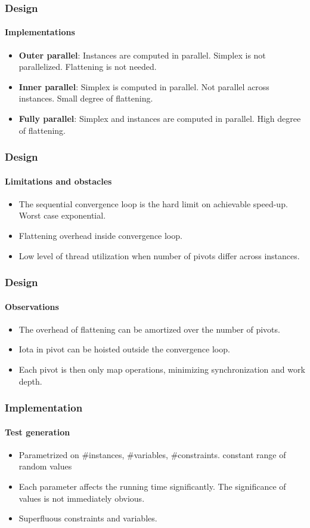 \documentclass{beamer}
\begin{document}
\begin{frame}
\frametitle{Design}
\framesubtitle{Implementations}
\begin{itemize}
	\item \textbf{Outer parallel}: Instances are computed in parallel. Simplex is not parallelized. Flattening is not needed.
	
	\item \textbf{Inner parallel}: Simplex is computed in parallel. Not parallel across instances. Small degree of flattening.
	
	\item \textbf{Fully parallel}: Simplex and instances are computed in parallel. High degree of flattening.
\end{itemize}
\end{frame}

\begin{frame}
\frametitle{Design}
\framesubtitle{Limitations and obstacles}
\begin{itemize}
	\item The sequential convergence loop is the hard limit on achievable speed-up. Worst case exponential. 
	
	\item Flattening overhead inside convergence loop.
	
	\item Low level of thread utilization when number of pivots differ across instances.
\end{itemize}
\end{frame}

\begin{frame}
\frametitle{Design}
\framesubtitle{Observations}
\begin{itemize}
	\item The overhead of flattening can be amortized over the number of pivots.
	
	\item Iota in pivot can be hoisted outside the convergence loop.
	
	\item Each pivot is then only map operations, minimizing synchronization and work depth.
\end{itemize}
\end{frame}


\begin{frame}
	\frametitle{Implementation}
	\framesubtitle{Test generation}
	\begin{itemize}
		\item Parametrized on \#instances, \#variables, \#constraints. constant range of random values
		
		\item Each parameter affects the running time significantly. The significance of values is not immediately obvious.
		
		\item Superfluous constraints and variables.
	\end{itemize}
\end{frame}
\end{document}
